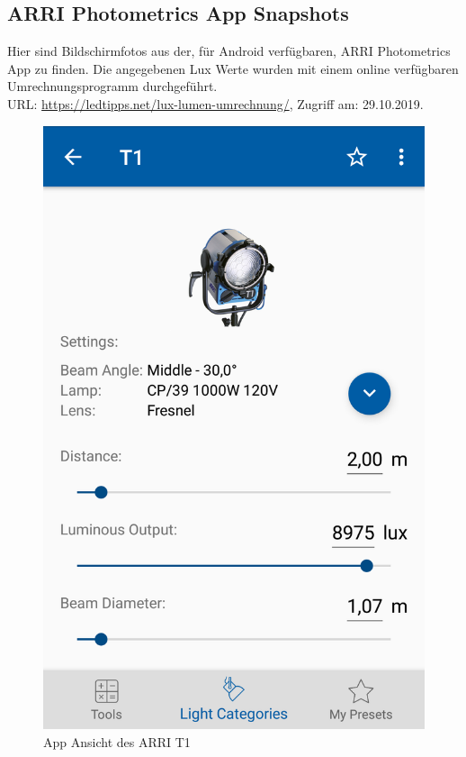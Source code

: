 \documentclass[11pt]{scrartcl}
\begin{document}
\subsection{ARRI Photometrics App Snapshots} \label{arriApp}
Hier sind Bildschirmfotos aus der, für Android verfügbaren, ARRI Photometrics App zu finden. Die angegebenen Lux Werte wurden mit einem
online verfügbaren Umrechnungsprogramm durchgeführt.\\
URL: \url{https://ledtipps.net/lux-lumen-umrechnung/}, Zugriff am: 29.10.2019.
\begin{figure}[H]
    \begin{center}
        \includegraphics[width=.7\textwidth]{images/arri_t1_data.png}
    \end{center}
    \caption{App Ansicht des ARRI T1}
\end{figure}
\noindent
\end{document}

